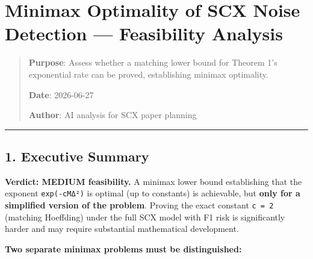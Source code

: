 \documentclass[
  12pt,
]{ctexart}
\author{SCX}
\date{2026}
\begin{document}
\section{Minimax Optimality of SCX Noise Detection --- Feasibility
Analysis}\label{minimax-optimality-of-scx-noise-detection-feasibility-analysis}

\begin{quote}
\textbf{Purpose}: Assess whether a matching lower bound for Theorem 1's
exponential rate can be proved, establishing minimax optimality.

\textbf{Date}: 2026-06-27

\textbf{Author}: AI analysis for SCX paper planning
\end{quote}

\begin{center}\rule{0.5\linewidth}{0.5pt}\end{center}

\subsection{1. Executive Summary}\label{executive-summary}

\textbf{Verdict: MEDIUM feasibility.} A minimax lower bound establishing
that the exponent \texttt{exp(-cMΔ²)} is optimal (up to constants) is
achievable, but \textbf{only for a simplified version of the problem}.
Proving the exact constant \texttt{c\ =\ 2} (matching Hoeffding) under
the full SCX model with F1 risk is significantly harder and may require
substantial mathematical development.

\textbf{Two separate minimax problems must be distinguished:}
\end{document}
